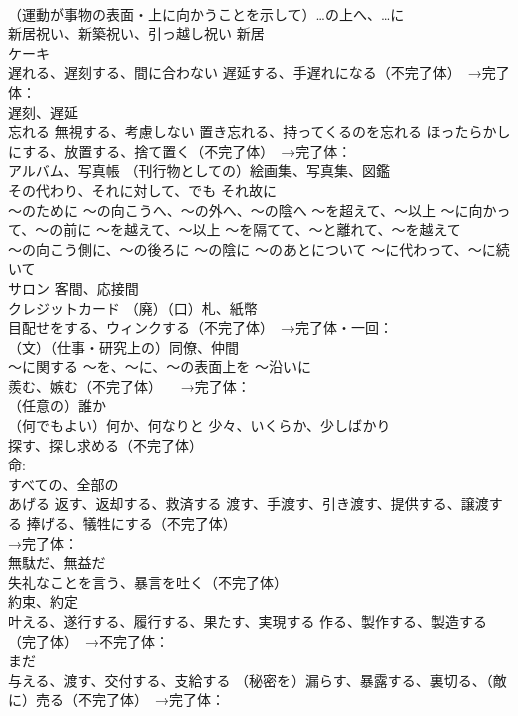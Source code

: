 \documentclass[8pt]{extreport}
\begin{document}
\begin{CJK}{UTF8}{min}
\\	（運動が事物の表面・上に向かうことを示して）…の上へ、…に
\\	新居祝い、新築祝い、引っ越し祝い 新居
\\	ケーキ
\\	遅れる、遅刻する、間に合わない 遅延する、手遅れになる（不完了体）　→完了体：
\\	遅刻、遅延
\\	忘れる 無視する、考慮しない 置き忘れる、持ってくるのを忘れる ほったらかしにする、放置する、捨て置く（不完了体）　→完了体：
\\	アルバム、写真帳 （刊行物としての）絵画集、写真集、図鑑
\\	その代わり、それに対して、でも それ故に
\\	～のために ～の向こうへ、～の外へ、～の陰へ ～を超えて、～以上 ～に向かって、～の前に ～を越えて、～以上 ～を隔てて、～と離れて、～を越えて 
\\	～の向こう側に、～の後ろに ～の陰に ～のあとについて ～に代わって、～に続いて
\\	サロン 客間、応接間
\\	クレジットカード （廃）（口）札、紙幣
\\	目配せをする、ウィンクする（不完了体）　→完了体・一回：
\\	（文）（仕事・研究上の）同僚、仲間
\\	～に関する ～を、～に、～の表面上を ～沿いに
\\	羨む、嫉む（不完了体） 　→完了体：
\\	[不定]（任意の）誰か
\\	[不定]（何でもよい）何か、何なりと 少々、いくらか、少しばかり
\\	探す、探し求める（不完了体）
\\	命:
\\	[定]すべての、全部の
\\	あげる 返す、返却する、救済する 渡す、手渡す、引き渡す、提供する、譲渡する 捧げる、犠牲にする（不完了体） 
\\	→完了体：
\\	無駄だ、無益だ
\\	失礼なことを言う、暴言を吐く（不完了体） 
\\	約束、約定
\\	叶える、遂行する、履行する、果たす、実現する 作る、製作する、製造する（完了体）　→不完了体：
\\	まだ
\\	与える、渡す、交付する、支給する （秘密を）漏らす、暴露する、裏切る、（敵に）売る（不完了体）　→完了体：

\end{CJK}
\end{document}
